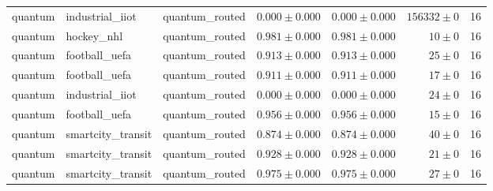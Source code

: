 \begin{table}[htbp]
\begin{tabular}{l l l r r r r}
quantum & industrial\_iiot & quantum\_routed & $0.000\pm0.000$ & $0.000\pm0.000$ & $156332\pm0$ & 16 \\
quantum & hockey\_nhl & quantum\_routed & $0.981\pm0.000$ & $0.981\pm0.000$ & $10\pm0$ & 16 \\
quantum & football\_uefa & quantum\_routed & $0.913\pm0.000$ & $0.913\pm0.000$ & $25\pm0$ & 16 \\
quantum & football\_uefa & quantum\_routed & $0.911\pm0.000$ & $0.911\pm0.000$ & $17\pm0$ & 16 \\
quantum & industrial\_iiot & quantum\_routed & $0.000\pm0.000$ & $0.000\pm0.000$ & $24\pm0$ & 16 \\
quantum & football\_uefa & quantum\_routed & $0.956\pm0.000$ & $0.956\pm0.000$ & $15\pm0$ & 16 \\
quantum & smartcity\_transit & quantum\_routed & $0.874\pm0.000$ & $0.874\pm0.000$ & $40\pm0$ & 16 \\
quantum & smartcity\_transit & quantum\_routed & $0.928\pm0.000$ & $0.928\pm0.000$ & $21\pm0$ & 16 \\
quantum & smartcity\_transit & quantum\_routed & $0.975\pm0.000$ & $0.975\pm0.000$ & $27\pm0$ & 16 \\
\hline
\end{tabular}
\end{table}

